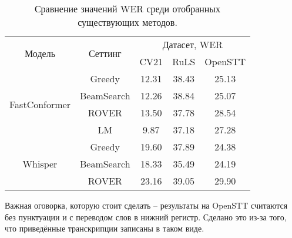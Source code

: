 \begin{table}[]
\centering
\caption{Сравнение значений WER среди отобранных существующих методов.}
\begin{tabular}{|c|c|ccc|}
\hline
\multirow{2}{*}{Модель}        & \multirow{2}{*}{Сеттинг}             & \multicolumn{3}{c|}{Датасет, WER}                                    \\ \cline{3-5} 
                               &                                      & \multicolumn{1}{c|}{CV21}  & \multicolumn{1}{c|}{RuLS}     & OpenSTT \\ \hline
\multirow{4}{*}{FastConformer} & Greedy                               & \multicolumn{1}{c|}{12.31} & \multicolumn{1}{c|}{38.43}    & 25.13   \\ \cline{2-5} 
                               & BeamSearch                           & \multicolumn{1}{c|}{12.26} & \multicolumn{1}{c|}{38.84}    & 25.07   \\ \cline{2-5}
                               & ROVER                                & \multicolumn{1}{c|}{13.50} & \multicolumn{1}{c|}{37.78}    & 28.54   \\ \cline{2-5}
                               & LM                                   & \multicolumn{1}{c|}{9.87}  & \multicolumn{1}{c|}{37.18}    & 27.28   \\ \hline 
\multirow{3}{*}{Whisper}       & Greedy                               & \multicolumn{1}{c|}{19.60} & \multicolumn{1}{c|}{37.89}    & 24.38   \\ \cline{2-5} 
                               & BeamSearch                           & \multicolumn{1}{c|}{18.33} & \multicolumn{1}{c|}{35.49}    & 24.19   \\ \cline{2-5}
                               & ROVER                                & \multicolumn{1}{c|}{23.16} & \multicolumn{1}{c|}{39.05}    & 29.90   \\ \hline
                               
\end{tabular}
\label{tab:res_base}
\end{table}

Важная оговорка, которую стоит сделать -- результаты на OpenSTT считаются без пунктуации и с переводом слов в нижний регистр.
Сделано это из-за того, что приведённые транскрипции записаны в таком виде.

